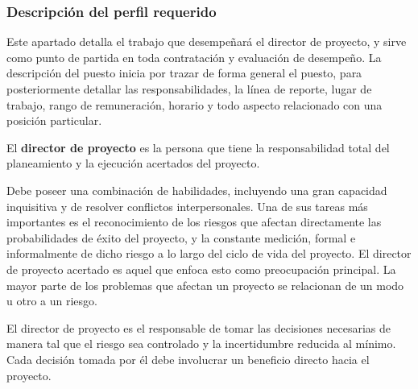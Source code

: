 \subsubsection{Descripción del perfil requerido}

Este apartado detalla el trabajo que desempeñará el director de proyecto, y sirve como punto de partida en toda contratación y evaluación de desempeño.
La descripción del puesto inicia por trazar de forma general el puesto, para posteriormente detallar las responsabilidades, la línea de reporte, lugar de trabajo, rango de remuneración, horario y todo aspecto relacionado con una posición particular.

El \textbf{director de proyecto} es la persona que tiene la responsabilidad total del planeamiento y la ejecución acertados del proyecto.

Debe poseer una combinación de habilidades, incluyendo una gran capacidad inquisitiva y de resolver conflictos interpersonales.
Una de sus tareas más importantes es el reconocimiento de los riesgos que afectan directamente las probabilidades de éxito del proyecto, y la constante medición, formal e informalmente de dicho riesgo a lo largo del ciclo de vida del proyecto.
El director de proyecto acertado es aquel que enfoca esto como preocupación principal.
La mayor parte de los problemas que afectan un proyecto se relacionan de un modo u otro a un riesgo.

El director de proyecto es el responsable de tomar las decisiones necesarias de manera tal que el riesgo sea controlado y la incertidumbre reducida al mínimo.
Cada decisión tomada por él debe involucrar un beneficio directo hacia el proyecto.

